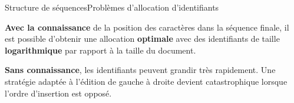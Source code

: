 
  
  

  
%     


\begin{frame}{Structure de séquences}{Problèmes d'allocation d'identifiants}

  \textbf{Avec la connaissance} de la position des caractères dans la séquence
  finale, il est possible d'obtenir une allocation \textbf{optimale} avec des
  identifiants de taille \textbf{logarithmique} par rapport à la taille du document.

  \vspace{0.1cm}

  \begin{center}
  
  \end{center}

  \vspace{0.25cm}

  \textbf{Sans connaissance}, les identifiants peuvent grandir très
  rapidement. Une stratégie adaptée à l'édition de gauche à droite devient
  catastrophique lorsque l'ordre d'insertion est opposé.

  
  \vspace{0.1cm}

  \begin{center}
    
  \end{center}

\end{frame}


